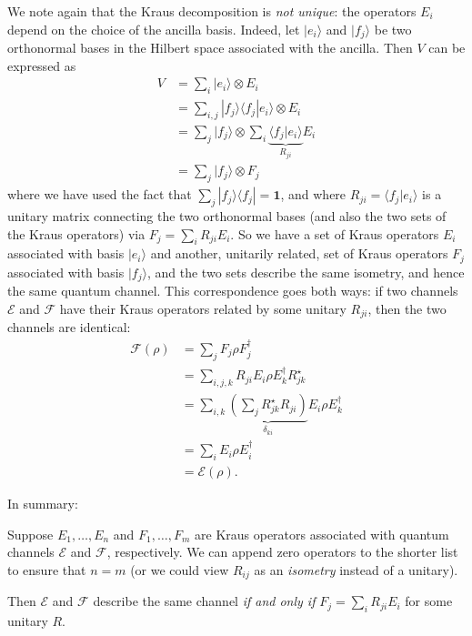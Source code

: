\documentclass[fleqn,a4paper]{article}
\newenvironment{idea}{\everypar{\setlength{\parindent}{1.5em}}}{}
\theoremstyle{definition}
\theoremstyle{definition}
\theoremstyle{definition}
\theoremstyle{definition}
\theoremstyle{remark}
\begin{document}
We note again that the Kraus decomposition is \emph{not unique}: the operators \(E_i\) depend on the choice of the ancilla basis.
Indeed, let \(|e_i\rangle\) and \(|f_j\rangle\) be two orthonormal bases in the Hilbert space associated with the ancilla.
Then \(V\) can be expressed as
\[
  \begin{aligned}
    V
    &= \sum_i|e_i\rangle\otimes E_i
  \\&= \sum_{i,j} |f_j\rangle\langle f_j|e_i\rangle\otimes E_i
  \\&= \sum_{j} |f_j\rangle \otimes \sum_i \underbrace{\langle f_j|e_i\rangle}_{R_{ji}} E_i
  \\&= \sum_{j} |f_j\rangle \otimes F_j
  \end{aligned}
\]
where we have used the fact that \(\sum_j |f_j\rangle\langle f_j|=\mathbf{1}\), and where \(R_{ji}=\langle f_j|e_i\rangle\) is a unitary matrix connecting the two orthonormal bases (and also the two sets of the Kraus operators) via \(F_j=\sum_i R_{ji} E_i\).
So we have a set of Kraus operators \(E_i\) associated with basis \(|e_i\rangle\) and another, unitarily related, set of Kraus operators \(F_j\) associated with basis \(|f_j\rangle\), and the two sets describe the same isometry, and hence the same quantum channel.
This correspondence goes both ways: if two channels \(\mathcal{E}\) and \(\mathcal{F}\) have their Kraus operators related by some unitary \(R_{ji}\), then the two channels are identical:
\[
  \begin{aligned}
    \mathcal{F}(\rho)
    &= \sum_j F_j\rho F^\dagger_j
  \\&= \sum_{i,j,k} R_{ji}E_i \rho E^\dagger_k R^\star_{jk}
  \\&=\sum_{i,k} \underbrace{\left(\sum_j R_{jk}^\star R_{ji}\right)}_{\delta_{ki}} E_i\rho E^\dagger_k
  \\&= \sum_i E_i\rho E^\dagger_i
  \\&= \mathcal{E}(\rho).
  \end{aligned}
\]

In summary:

\begin{idea}
Suppose \(E_1,\ldots,E_n\) and \(F_1,\ldots,F_m\) are Kraus operators associated with quantum channels \(\mathcal{E}\) and \(\mathcal{F}\), respectively.
We can append zero operators to the shorter list to ensure that \(n=m\) (or we could view \(R_{ij}\) as an \emph{isometry} instead of a unitary).

Then \(\mathcal{E}\) and \(\mathcal{F}\) describe the same channel \emph{if and only if} \(F_j=\sum_i R_{ji} E_i\) for some unitary \(R\).

\end{idea}
\end{document}
